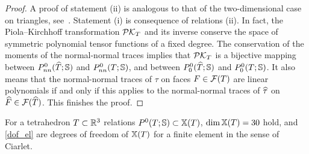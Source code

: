 \documentclass[11pt]{article}
\begin{document}
\begin{proof}
A proof of statement (ii) is analogous to that of the two-dimensional case on
triangles, see~\cite[Lemma~13]{CarstensenH_NNC}. Statement (i) is consequence of
relations (ii). In fact, the Piola--Kirchhoff transformation $\mathcal{PK}_{{T}}$
and its inverse conserve the space of symmetric polynomial tensor functions of a fixed degree.
The conservation of the moments of the normal-normal traces implies that
$\mathcal{PK}_{{T}}$ is a bijective mapping between $P^0_{nn}({\widehat T};\mathbb{S})$  and $P^0_{nn}(T;\mathbb{S})$,
and between $P^0_0({\widehat T};\mathbb{S})$ and $P^0_0(T;\mathbb{S})$.
It also means that the normal-normal traces of $\tau$ on faces $F\in\mathcal{F}(T)$
are linear polynomials if and only if this applies to the normal-normal traces of ${\widehat\tau}$ on
${\widehat F}\in\mathcal{F}({\widehat T})$. This finishes the proof.
\end{proof}

\begin{prop} \label{prop_dof}
For a tetrahedron $T\subset\mathbb{R}^3$ relations
$P^0(T;\mathbb{S})\subset \mathbb{X}(T)$, $\dim\mathbb{X}(T)=30$ hold, and
\eqref{dof_el} are degrees of freedom of $\mathbb{X}(T)$ for a finite element in the sense of Ciarlet.
\end{prop}
\end{document}
